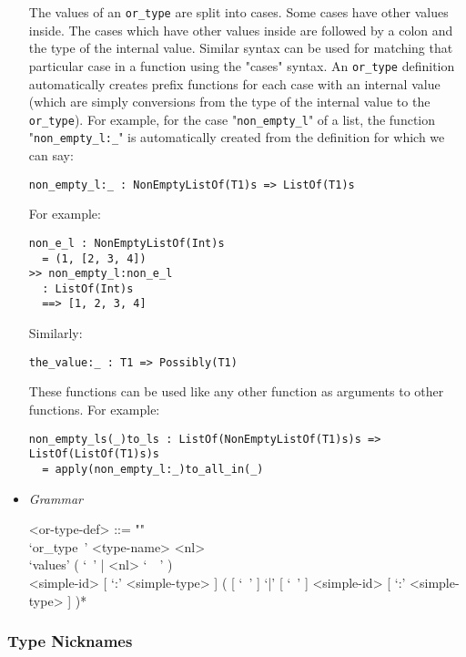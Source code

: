 \documentclass{article}
\begin{document}
\begin{itemize}
The values of an \verb|or_type| are split into cases. Some cases have other
values inside.  The cases which have other values inside are followed by a
colon and the type of the internal value. Similar syntax can be used for
matching that particular case in a function using the "cases" syntax.  An
\verb|or_type| definition automatically creates prefix functions for each
case with an internal value (which are simply conversions from the type of the
internal value to the \verb|or_type|).  For example, for the case
"\verb|non_empty_l|" of a list, the function "\verb|non_empty_l:_|" is
automatically created from the definition for which we can say:
\begin{verbatim}
non_empty_l:_ : NonEmptyListOf(T1)s => ListOf(T1)s
\end{verbatim}
For example:
\begin{verbatim}
non_e_l : NonEmptyListOf(Int)s
  = (1, [2, 3, 4])
>> non_empty_l:non_e_l
  : ListOf(Int)s
  ==> [1, 2, 3, 4]
\end{verbatim}
Similarly:
\begin{verbatim}
the_value:_ : T1 => Possibly(T1)
\end{verbatim}
These functions can be used like any other function as arguments to other
functions.  For example:
\begin{verbatim}
non_empty_ls(_)to_ls : ListOf(NonEmptyListOf(T1)s)s => ListOf(ListOf(T1)s)s
  = apply(non_empty_l:_)to_all_in(_)
\end{verbatim}

\item \textit{Grammar}

\begin{grammar}
<or-type-def> ::= ""\\
`or_type\ ' <type-name> <nl> \\
`values' ( `\ ' | <nl> `\ \ ' ) \\
<simple-id> [ `:' <simple-type> ]
( [ `\ ' ] `|' [ `\ ' ] <simple-id> [ `:' <simple-type> ] )*
\end{grammar}

\end{itemize}

\subsubsection{Type Nicknames}
\end{document}
